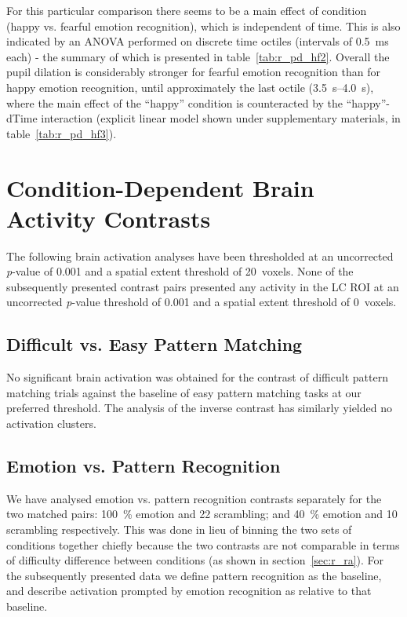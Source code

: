 	    For this particular comparison there seems to be a main effect of condition (happy vs. fearful emotion recognition), which is independent of time.
	    This is also indicated by an ANOVA performed on discrete time octiles (intervals of \SI{0.5}{\milli\second} each) - the summary of which is presented in table~\ref{tab:r_pd_hf2}.
	    Overall the pupil dilation is considerably stronger for fearful emotion recognition than for happy emotion recognition, until approximately the last octile (\SIrange{3.5}{4.0}{\second}), where the main effect of the “happy” condition is counteracted by the “happy”-dTime interaction (explicit linear model shown under supplementary materials, in table~\ref{tab:r_pd_hf3}).
	    
    \section{Condition-Dependent Brain Activity Contrasts}\label{sec:r_pc}
	The following brain activation analyses have been thresholded at an uncorrected \textit{p}-value of 0.001 and a spatial extent threshold of \SI{20}{voxels}.
	None of the subsequently presented contrast pairs presented any activity in the LC ROI at an uncorrected \textit{p}-value threshold of 0.001 and a spatial extent threshold of \SI{0}{voxels}.  
	\subsection{Difficult vs. Easy Pattern Matching}\label{sec:r_pc_ed}
	    No significant brain activation was obtained for the contrast of difficult pattern matching trials against the baseline of easy pattern matching tasks at our preferred threshold.
	    The analysis of the inverse contrast has similarly yielded no activation clusters.
	\subsection{Emotion vs. Pattern Recognition}\label{sec:r_pc_ep}
	    We have analysed emotion vs. pattern recognition contrasts separately for the two matched pairs: \SI{100}{\percent} emotion and \SI{22}{\pixel} scrambling; and \SI{40}{\percent} emotion and \SI{10}{\pixel} scrambling respectively.
	    This was done in lieu of binning the two sets of conditions together chiefly because the two contrasts are not comparable in terms of difficulty difference between conditions (as shown in section~\ref{sec:r_ra}).
	    For the subsequently presented data we define pattern recognition as the baseline, and describe activation prompted by emotion recognition as relative to that baseline.
